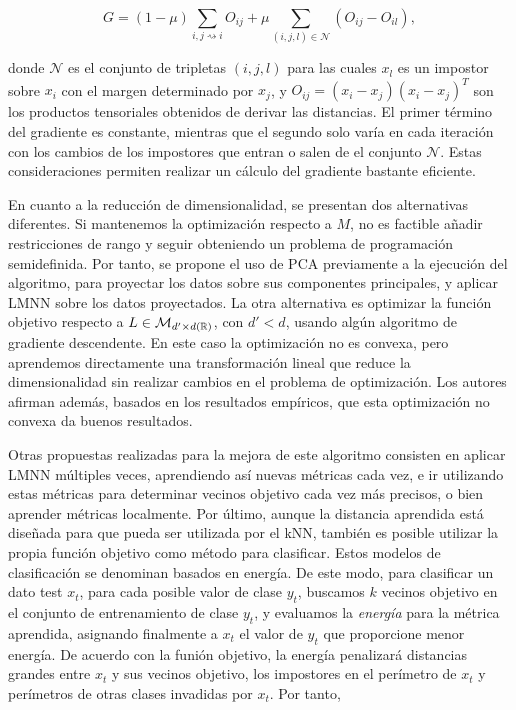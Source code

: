 \documentclass{book}
\newcommand{\istargetof}{\rightsquigarrow}
\begin{document}
\[ G = (1-\mu) \sum_{i,j\istargetof i} O_{ij} + \mu \sum_{(i,j,l) \in \mathcal{N}} (O_{ij} - O_{il}), \]

donde $\mathcal{N}$ es el conjunto de tripletas $(i,j,l)$ para las cuales $x_l$ es un impostor sobre $x_i$ con el margen determinado por $x_j$, y $O_{ij} = (x_i - x_j)(x_i - x_j)^T$ son los productos tensoriales obtenidos de derivar las distancias. El primer término del gradiente es constante, mientras que el segundo solo varía en cada iteración con los cambios de los impostores que entran o salen de el conjunto $\mathcal{N}$. Estas consideraciones permiten realizar un cálculo del gradiente bastante eficiente.

En cuanto a la reducción de dimensionalidad, se presentan dos alternativas diferentes. Si mantenemos la optimización respecto a $M$, no es factible añadir restricciones de rango y seguir obteniendo un problema de programación semidefinida. Por tanto, se propone el uso de PCA previamente a la ejecución del algoritmo, para proyectar los datos sobre sus componentes principales, y aplicar LMNN sobre los datos proyectados. La otra alternativa es optimizar la función objetivo respecto a $L \in \mathcal{M}_{d'\times d(\mathbb{R})}$, con $d' < d$, usando algún algoritmo de gradiente descendente. En este caso la optimización no es convexa, pero aprendemos directamente una transformación lineal que reduce la dimensionalidad sin realizar cambios en el problema de optimización. Los autores afirman además, basados en los resultados empíricos, que esta optimización no convexa da buenos resultados.

Otras propuestas realizadas para la mejora de este algoritmo consisten en aplicar LMNN múltiples veces, aprendiendo así nuevas métricas cada vez, e ir utilizando estas métricas para determinar vecinos objetivo cada vez más precisos, o bien aprender métricas localmente. Por último, aunque la distancia aprendida está diseñada para que pueda ser utilizada por el kNN, también es posible utilizar la propia función objetivo como método para clasificar. Estos modelos de clasificación se denominan basados en energía. De este modo, para clasificar un dato test $x_t$, para cada posible valor de clase $y_t$, buscamos $k$ vecinos objetivo en el conjunto de entrenamiento de clase $y_t$, y evaluamos la \emph{energía} para la métrica aprendida, asignando finalmente a $x_t$ el valor de $y_t$ que proporcione menor energía. De acuerdo con la funión objetivo, la energía penalizará distancias grandes entre $x_t$ y sus vecinos objetivo, los impostores en el perímetro de $x_t$ y perímetros de otras clases invadidas por $x_t$. Por tanto,
\end{document}
